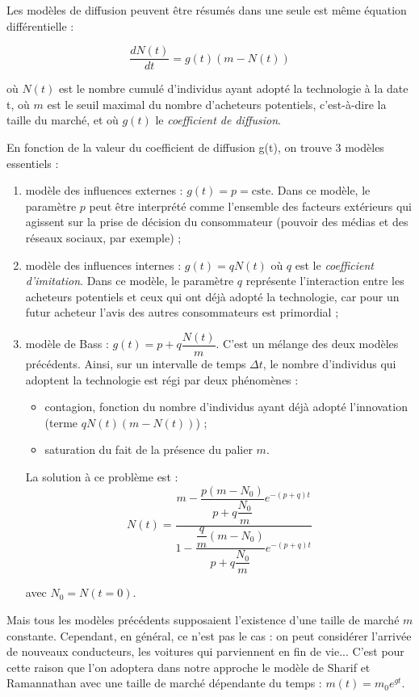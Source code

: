 \documentclass[10pt]{article}
\begin{document}
		Les modèles de diffusion peuvent être résumés dans une seule est même équation différentielle : 
	
			\[
				\dfrac{dN(t)}{dt}=g(t)(m-N(t))
			\]
		
		où $N(t)$ est le nombre cumulé d'individus ayant adopté la technologie à la date t, où $m$ est le seuil maximal du nombre d’acheteurs potentiels, c'est-à-dire la taille du marché, et où $g(t)$ le \textit{coefficient de diffusion}.
		
		
		En fonction de la valeur du coefficient de diffusion g(t), on trouve 3 modèles essentiels :
	
		\begin{enumerate}
			\item modèle des influences externes : $g(t) = p = \text{cste}$.
			Dans ce modèle, le paramètre $p$ peut être interprété comme l’ensemble des facteurs extérieurs qui agissent sur la prise de décision du consommateur (pouvoir des médias et des réseaux sociaux, par exemple) ;
			\item modèle des influences internes : $g(t) = q N(t)$ où $q$ est le \textit{coefficient d’imitation}. Dans ce modèle, le paramètre $q$ représente l’interaction entre les acheteurs potentiels et ceux qui ont déjà adopté la technologie, car pour un futur acheteur l’avis des autres consommateurs est primordial ;
			\item modèle de Bass : $g(t) = p + q \dfrac{N(t)}{m}$. C’est un mélange des deux modèles précédents. Ainsi, sur un intervalle de temps $\Delta t$, le nombre d’individus qui adoptent la technologie est régi par deux phénomènes : 

			\begin{itemize}
				\item contagion, fonction du nombre d’individus ayant déjà adopté l’innovation (terme $q N(t)(m - N(t))$) ;
				\item saturation du fait de la présence du palier $m$.

			\end{itemize}

			La solution à ce problème est :
				\[
					N(t) = \dfrac{m - \dfrac{p (m - N_0)}{p + q \dfrac{N_0}{m}} e^{-(p+q)t}}{1 - \dfrac{\dfrac{q}{m} (m - N_0)}{p + q \dfrac{N_0}{m}} e^{-(p+q)t}}
				\]
				
			avec $N_0 = N(t = 0)$.
		
		\end{enumerate}
		
		Mais tous les modèles précédents supposaient l’existence d’une taille de marché $m$ constante. Cependant, en général, ce n’est pas le cas : on peut considérer l’arrivée de nouveaux conducteurs, les voitures qui parviennent en fin de vie... C’est pour cette raison que l’on adoptera dans notre approche le modèle de Sharif et Ramannathan avec une taille de marché dépendante du temps : $m(t) = m_0 e^{gt}$.
		
\end{document}
